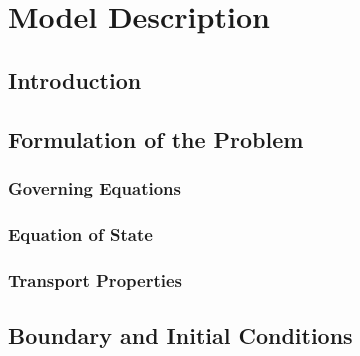 \chapter{Model Description}


\section{Introduction}
\section{Formulation of the Problem}
\subsection{Governing Equations}
\subsection{Equation of State}
\subsection{Transport Properties}

\section{Boundary and Initial Conditions}


